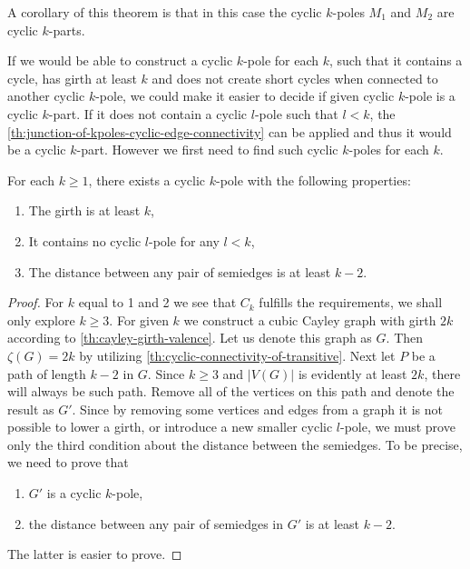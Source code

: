 \documentclass[12pt, twoside]{book}
\begin{document}
A corollary of this theorem is that in this case the cyclic $k$-poles $M_1$ and $M_2$ are cyclic $k$-parts.

If we would be able to construct a cyclic $k$-pole for each $k$, such that it contains a cycle, has girth at least $k$ and does not create short cycles when connected to another cyclic $k$-pole, we could make it easier to decide if given cyclic $k$-pole is a cyclic $k$-part. If it does not contain a cyclic $l$-pole such that $l<k$, the \cref{th:junction-of-kpoles-cyclic-edge-connectivity} can be applied and thus it would be a cyclic $k$-part. However we first need to find such cyclic $k$-poles for each $k$. 


\begin{lemma}\label{lem:cyclic-k-pole-no-short-cycles-exists}
	For each $k\geq 1$, there exists a cyclic $k$-pole with the following properties:
	\begin{enumerate}
		\item The girth is at least $k$,
		\item It contains no cyclic $l$-pole for any $l<k$,
		\item The distance between any pair of semiedges is at least $k-2$.
	\end{enumerate}
\end{lemma}

\begin{proof}
	For $k$ equal to 1 and 2 we see that $C_k$ fulfills the requirements, we shall only explore $k\geq 3$. For given $k$ we construct a cubic Cayley graph with girth $2k$ according to \cref{th:cayley-girth-valence}. Let us denote this graph as $G$. Then $\zeta(G)=2k$ by utilizing \cref{th:cyclic-connectivity-of-transitive}. Next let $P$ be a path of length $k-2$ in $G$. Since $k\geq 3$ and $|V(G)|$ is evidently at least $2k$, there will always be such path. Remove all of the vertices on this path and denote the result as $G'$. Since by removing some vertices and edges from a graph it is not possible to lower a girth, or introduce a new smaller cyclic $l$-pole, we must prove only the third condition about the distance between the semiedges. To be precise, we need to prove that
	\begin{enumerate}
		\item $G'$ is a cyclic $k$-pole,
		\item the distance between any pair of semiedges in $G'$ is at least $k-2$.
	\end{enumerate}
	The latter is easier to prove. 
	
\end{proof}
\end{document}
